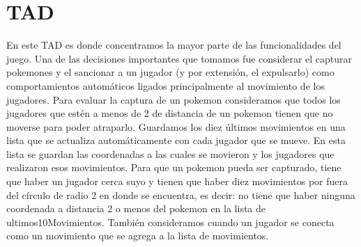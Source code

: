 \section{TAD }

En este TAD es donde concentramos la mayor parte de las funcionalidades del juego. Una de las decisiones importantes que tomamos fue considerar el capturar pokemones y el sancionar a un jugador (y por extensión, el expulsarlo) como comportamientos automáticos ligados principalmente al movimiento de los jugadores.
Para evaluar la captura de un pokemon consideramos que todos los jugadores que estén a menos de 2 de distancia de un pokemon tienen que no moverse para poder atraparlo. Guardamos los diez últimos movimientos en una lista que se actualiza automáticamente con cada jugador que se mueve. En esta lista se guardan las coordenadas a las cuales se movieron y los jugadores que realizaron esos movimientos. Para que un pokemon pueda ser capturado, tiene que haber un jugador cerca suyo y tienen que haber diez movimientos por fuera del círculo de radio 2 en donde se encuentra, es decir: no tiene que haber ninguna coordenada a distancia 2 o menos del pokemon en la lista de ultimos10Movimientos.
También consideramos cuando un jugador se conecta como un movimiento que se agrega a la lista de movimientos.

